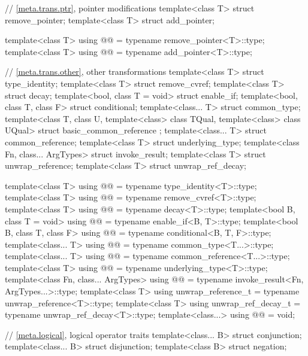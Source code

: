 \begin{codeblock}
{  // \ref{meta.trans.ptr}, pointer modifications
  template<class T> struct remove_pointer;
  template<class T> struct add_pointer;

  template<class T>
    using @@ = typename remove_pointer<T>::type;
  template<class T>
    using @@    = typename add_pointer<T>::type;

  // \ref{meta.trans.other}, other transformations
  template<class T> struct type_identity;
  template<class T> struct remove_cvref;
  template<class T> struct decay;
  template<bool, class T = void> struct enable_if;
  template<bool, class T, class F> struct conditional;
  template<class... T> struct common_type;
  template<class T, class U, template<class> class TQual, template<class> class UQual>
    struct basic_common_reference { };
  template<class... T> struct common_reference;
  template<class T> struct underlying_type;
  template<class Fn, class... ArgTypes> struct invoke_result;
  template<class T> struct unwrap_reference;
  template<class T> struct unwrap_ref_decay;

  template<class T>
    using @@    = typename type_identity<T>::type;
  template<class T>
    using @@     = typename remove_cvref<T>::type;
  template<class T>
    using @@            = typename decay<T>::type;
  template<bool B, class T = void>
    using @@        = typename enable_if<B, T>::type;
  template<bool B, class T, class F>
    using @@      = typename conditional<B, T, F>::type;
  template<class... T>
    using @@      = typename common_type<T...>::type;
  template<class... T>
    using @@ = typename common_reference<T...>::type;
  template<class T>
    using @@  = typename underlying_type<T>::type;
  template<class Fn, class... ArgTypes>
    using @@    = typename invoke_result<Fn, ArgTypes...>::type;
  template<class T>
    using unwrap_reference_t = typename unwrap_reference<T>::type;
  template<class T>
    using unwrap_ref_decay_t = typename unwrap_ref_decay<T>::type;
  template<class...>
    using @@             = void;

  // \ref{meta.logical}, logical operator traits
  template<class... B> struct conjunction;
  template<class... B> struct disjunction;
  template<class B> struct negation;

}
\end{codeblock}
